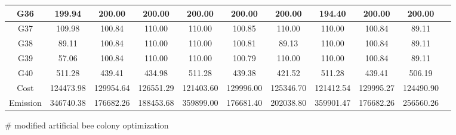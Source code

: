 \begin{table*}
\begin{threeparttable}[c]
{\begin{tabular}{|c|c|c|c|c|c|c|c|c|c|c|}
\hline
G36	&	199.94	&	200.00	&	200.00	&	200.00	&	200.00	&	200.00	&	194.40	&	200.00	&	200.00\\
\hline
G37	&	109.98	&	100.84	&	110.00	&	110.00	&	100.85	&	110.00	&	110.00	&	100.84	&	89.11\\
\hline
G38	&	89.11	&	100.84	&	110.00	&	110.00	&	100.81	&	89.13	&	110.00	&	100.84	&	89.11\\
\hline
G39	&	57.06	&	100.84	&	110.00	&	110.00	&	100.79	&	110.00	&	110.00	&	100.84	&	89.11\\
\hline
G40	&	511.28	&	439.41	&	434.98	&	511.28	&	439.38	&	421.52	&	511.28	&	439.41	&	506.19\\
\hline
Cost &	124473.98	&	129954.64	&	126551.29	&	121403.60	&	129996.00	&	125346.70	&	121412.54	&	129995.27	&	124490.90\\
\hline
Emission &	346740.38	&	176682.26	&	188453.68	&	359899.00	&	176681.40	&	202038.80	&	359901.47	&	176682.26	&	256560.26\\
\hline
\end{tabular}
}
\begin{tablenotes}
\item[\#] modified artificial bee colony optimization
\end{tablenotes}
\end{threeparttable}
\end{table*}

